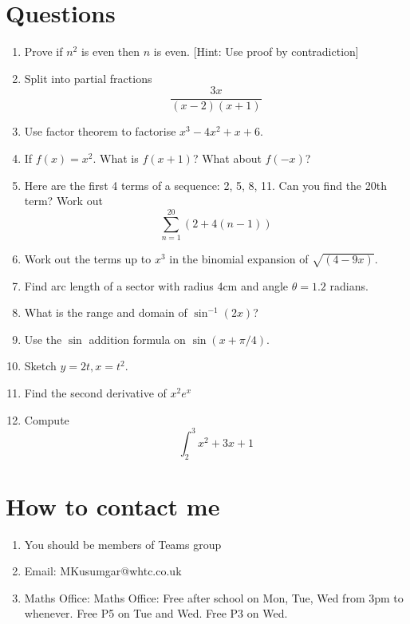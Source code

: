 \documentclass[12pt]{article}
\begin{document}
    \section*{Questions}
    \begin{enumerate}
        \item Prove if $n^2$ is even then $n$ is even. [Hint: Use proof by contradiction]
        \item Split into partial fractions \[\frac{3x}{(x-2)(x+1)}\]
        \item Use factor theorem to factorise $x^3 -4x^2 +x +6$.
        \item If $f(x) = x^2$. What is $f(x+1)$? What about $f(-x)$?
        \item Here are the first 4 terms of a sequence: 2, 5, 8, 11. Can you find the 20th term?
        Work out \[\sum^{20}_{n=1} (2+4(n-1))\]
        \item Work out the terms up to $x^3$ in the binomial expansion of $\sqrt{(4-9x)}$.
        \item Find arc length of a sector with radius 4cm and angle $\theta = 1.2$ radians.
        \item What is the range and domain of $\sin^{-1}(2x)$?
        \item Use the $\sin$ addition formula on $\sin(x + \pi/4)$.
        \item Sketch $y=2t, x=t^2$.
        \item Find the second derivative of $x^2 e^x$
        \item Compute \[\int^3_{2} x^2 + 3x + 1\]
    \end{enumerate}

    \section*{How to contact me}
    \begin{enumerate}
        \item You should be members of Teams group
        \item Email: MKusumgar@whtc.co.uk
        \item Maths Office: Maths Office: Free after school on Mon, Tue, Wed from 3pm to whenever. Free P5 on Tue and Wed. Free P3 on Wed.
    \end{enumerate}
\end{document}
